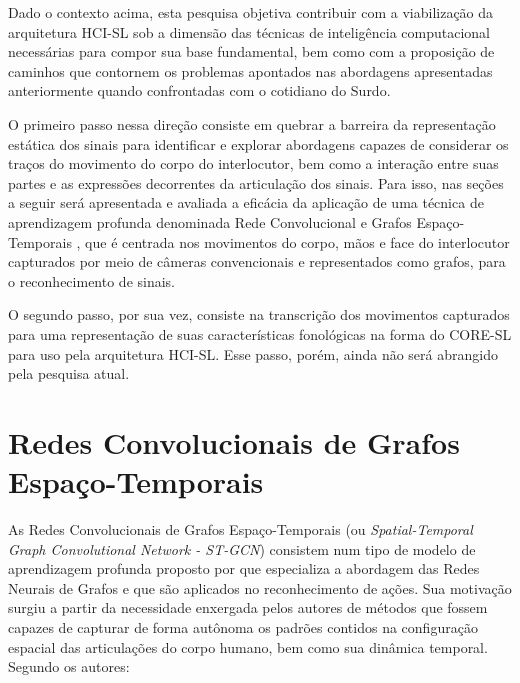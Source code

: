 Dado o contexto acima, esta pesquisa objetiva contribuir com a viabilização da arquitetura HCI-SL sob a dimensão das técnicas de inteligência computacional necessárias para compor sua base fundamental, bem como com a proposição de caminhos que contornem os problemas apontados nas abordagens apresentadas anteriormente quando confrontadas com o cotidiano do Surdo. 

O primeiro passo nessa direção consiste em quebrar a barreira da representação estática dos sinais para identificar e explorar abordagens capazes de considerar os traços do movimento do corpo do interlocutor, bem como a interação entre suas partes e as expressões decorrentes da articulação dos sinais. Para isso, nas seções a seguir será apresentada e avaliada a eficácia da aplicação de uma técnica de aprendizagem profunda denominada Rede Convolucional e Grafos Espaço-Temporais \cite{st-gcn-2018}, que é centrada nos movimentos do corpo, mãos e face do interlocutor capturados por meio de câmeras convencionais e representados como grafos, para o reconhecimento de sinais. 

O segundo passo, por sua vez, consiste na transcrição dos movimentos capturados para uma representação de suas características fonológicas na forma do CORE-SL para uso pela arquitetura HCI-SL. Esse passo, porém, ainda não será abrangido pela pesquisa atual.


\section{Redes Convolucionais de Grafos Espaço-Temporais} %

As Redes Convolucionais de Grafos Espaço-Temporais (ou \textit{Spatial-Temporal Graph Convolutional Network - ST-GCN}) consistem num tipo de modelo de aprendizagem profunda proposto por \cite{st-gcn-2018} que especializa a abordagem das Redes Neurais de Grafos e que são aplicados no reconhecimento de ações. Sua motivação surgiu a partir da necessidade enxergada pelos autores de métodos que fossem capazes de capturar de forma autônoma os padrões contidos na configuração espacial das articulações do corpo humano, bem como sua dinâmica temporal. Segundo os autores:

